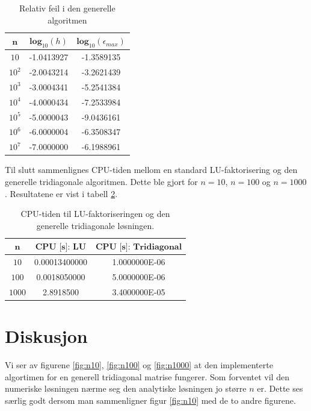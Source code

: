 \documentclass{article}
\begin{document}
\FloatBarrier
\begin{table}[!ht]
\caption{Relativ feil i den generelle algoritmen}
\centering
\label{error}
\begin{tabular}{|c|c|c|}
\hline
$\textbf{n}$   &  $\textbf{log}_{10}(h)$  & $\textbf{log}_{10}(\epsilon_{max})$ \\
\hline
$10$     & -1.0413927  &   -1.3589135                  \\ 
\hline
$10^2$ & -2.0043214   &  -3.2621439                 \\ 
\hline
$10^3$ & -3.0004341  &   -5.2541384               \\ 
\hline
$10^4$ & -4.0000434   &  -7.2533984                  \\ 
\hline
$10^5$ & -5.0000043    &  -9.0436161                \\ 
\hline
$10^6$ & -6.0000004   &   -6.3508347         \\ 
\hline       
$10^7$ & -7.0000000   &   -6.1988961      \\
\hline
\end{tabular}
\end{table}
\FloatBarrier

Til slutt sammenlignes CPU-tiden mellom en standard LU-faktorisering og den generelle tridiagonale algoritmen. Dette ble gjort for $n=10$, $n=100$ og $n=1000$. Resultatene er vist i tabell \ref{LUCPU}.

\FloatBarrier
\begin{table}[!ht]
\caption{CPU-tiden til LU-faktoriseringen og den generelle tridiagonale løsningen.}
\centering
\label{LUCPU}
\begin{tabular}{|c|c|c|}
\hline
$\textbf{n}$   &  $\textbf{CPU [s]: LU}$  & $\textbf{CPU [s]: Tridiagonal}$ \\
\hline
$10$     & 0.00013400000  &   1.0000000E-06                  \\ 
\hline
$100$ & 0.0018050000   &  5.0000000E-06                 \\ 
\hline
$1000$ & 2.8918500     &   3.4000000E-05               \\ 
\hline
\end{tabular}
\end{table}
\FloatBarrier



\section{Diskusjon}
Vi ser av figurene \ref{fig:n10}, \ref{fig:n100} og \ref{fig:n1000} at den implementerte algortimen for en generell tridiagonal matrise fungerer. Som forventet vil den numeriske løsningen nærme seg den analytiske løsningen jo større $n$ er. Dette ses særlig godt dersom man sammenligner figur \ref{fig:n10} med de to andre figurene. \\
\end{document}
